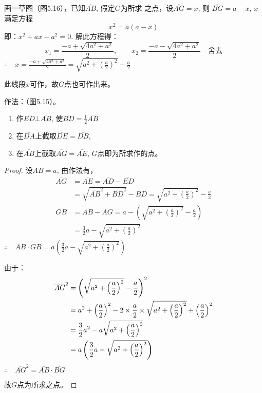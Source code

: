 \begin{analyze}
    画一草图（图5.16），已知$\overline{AB}$, 假定$G$为所求
    之点，设$\overline{AG}=x$, 则
    $\overline{BG}=a-x$,
    $x$满足方程
\[    x^2=a(a-x)\]
    即：$x^2+ax-a^2=0$. 解此方程得：
\[x_1=\frac{-a+\sqrt{4a^2+a^2}}{2},\qquad x_2=\frac{-a-\sqrt{4a^2+a^2}}{2}\quad \text{舍去}\]
$\therefore\quad x=\frac{-a+\sqrt{4a^2+a^2}}{2}=\sqrt{a^2+\left(\frac{a}{2}\right)^2}-\frac{a}{2}$

此线段$x$可作，故$G$点也可作出来。
\end{analyze}

作法：（图5.15）。
\begin{enumerate}
\item 作$\overline{ED}\bot\overline{AB}$, 使$\overline{BD}=\frac{1}{2}\overline{AB}$
\item 在$\overline{DA}$上截取$\overline{DE}=\overline{DB}$,\item 在$\overline{AB}$上截取$\overline{AG}=\overline{AE}$, $G$点即为所求作的点。
\end{enumerate}

\begin{proof}
    设$\overline{AB}=a$, 由作法有，
\[\begin{split}
    \overline{AG}&=\overline{AE}=\overline{AD}-\overline{ED}\\
&=\sqrt{\overline{AB}^2+\overline{BD}^2  }-\overline{BD}=\sqrt{a^2+\left(\frac{a}{2}\right)^2}-\frac{a}{2}\\
\overline{GB}&=\overline{AB}-\overline{AG}=a-\left(\sqrt{a^2+\left(\frac{a}{2}\right)^2}-\frac{a}{2}\right)\\
&=\frac{3}{2}a-\sqrt{a^2+\left(\frac{a}{2}\right)^2}
\end{split}\]
$\therefore\quad \overline{AB}\cdot \overline{GB}=a\left(\frac{3}{2}a-\sqrt{a^2+\left(\frac{a}{2}\right)^2}\right)$

由于：
\[\begin{split}
    \overline{AG}^2&=\left(\sqrt{a^2+\left(\dfrac{a}{2}\right)^2}-\dfrac{a}{2}\right)^2\\
&=a^2+\left(\dfrac{a}{2}\right)^2-2\times\dfrac{a}{2}\times \sqrt{a^2+\left(\dfrac{a}{2}\right)^2}+\left(\dfrac{a}{2}\right)^2\\
&=\dfrac{3}{2}a^2-a\sqrt{a^2+\left(\dfrac{a}{2}\right)^2}\\
&=a\left(\dfrac{3}{2}a-\sqrt{a^2+\left(\dfrac{a}{2}\right)^2}\right)
\end{split}
    \]
$\therefore\quad \overline{AG}^2=\overline{AB}\cdot \overline{BG}$

故$G$点为所求之点。
\end{proof}

